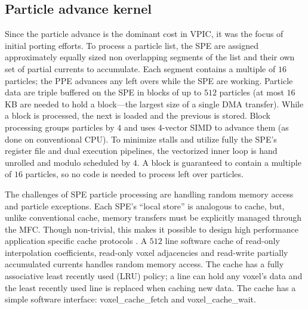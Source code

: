 \documentclass[journal,twoside]{IEEEtran}
\begin{document}

\subsection{Particle advance kernel}

Since the particle advance is the dominant cost in VPIC, it was the
focus of initial porting efforts.  To process a particle list, the SPE
are assigned approximately equally sized non overlapping segments of
the list and their own set of partial currents to accumulate.  Each
segment contains a multiple of $16$ particles; the PPE advances any
left overs while the SPE are working.  Particle data are triple
buffered on the SPE in blocks of up to $512$ particles (at most $16$
KB are needed to hold a block---the largest size of a single DMA
transfer).  While a block is processed, the next is loaded and the
previous is stored.
Block processing groups particles by $4$ and uses $4$-vector SIMD to
advance them (as done on conventional CPU).  To minimize stalls and
utilize fully the SPE's register file and dual execution pipelines,
the vectorized inner loop is hand unrolled and modulo scheduled by
$4$.  A block is guaranteed to contain a multiple of $16$ particles,
so no code is needed to process left over particles.

The challenges of SPE particle processing are handling random memory
access and particle exceptions.  Each SPE's ``local store'' is
analogous to cache, but, unlike conventional cache, memory transfers
must be explicitly managed through the MFC.  Though non-trivial, this
makes it possible to design high performance application specific
cache protocols \cite{Kahle_et_al_2005}.  A $512$ line software cache
of read-only interpolation coefficients, read-only voxel adjacencies
and read-write partially accumulated currents handles random memory
access.  The cache has a fully associative least recently used (LRU)
policy; a line can hold any voxel's data and the least recently used
line is replaced when caching new data.  The cache has a simple
software interface: voxel\_cache\_fetch and voxel\_cache\_wait.
\end{document}
